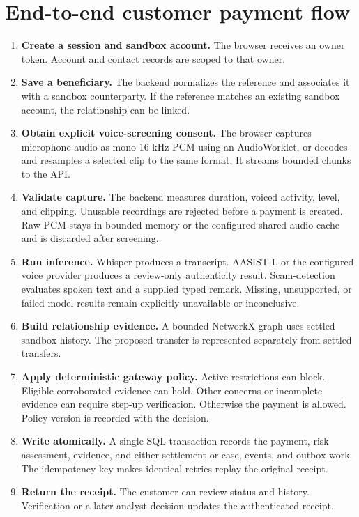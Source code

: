 \documentclass[11pt,a4paper]{article}
\begin{document}
\section{End-to-end customer payment flow}
\begin{enumerate}
\item \textbf{Create a session and sandbox account.} The browser receives an owner token. Account and contact records are scoped to that owner.
\item \textbf{Save a beneficiary.} The backend normalizes the reference and associates it with a sandbox counterparty. If the reference matches an existing sandbox account, the relationship can be linked.
\item \textbf{Obtain explicit voice-screening consent.} The browser captures microphone audio as mono 16 kHz PCM using an AudioWorklet, or decodes and resamples a selected clip to the same format. It streams bounded chunks to the API.
\item \textbf{Validate capture.} The backend measures duration, voiced activity, level, and clipping. Unusable recordings are rejected before a payment is created. Raw PCM stays in bounded memory or the configured shared audio cache and is discarded after screening.
\item \textbf{Run inference.} Whisper produces a transcript. AASIST-L or the configured voice provider produces a review-only authenticity result. Scam-detection evaluates spoken text and a supplied typed remark. Missing, unsupported, or failed model results remain explicitly unavailable or inconclusive.
\item \textbf{Build relationship evidence.} A bounded NetworkX graph uses settled sandbox history. The proposed transfer is represented separately from settled transfers.
\item \textbf{Apply deterministic gateway policy.} Active restrictions can block. Eligible corroborated evidence can hold. Other concerns or incomplete evidence can require step-up verification. Otherwise the payment is allowed. Policy version is recorded with the decision.
\item \textbf{Write atomically.} A single SQL transaction records the payment, risk assessment, evidence, and either settlement or case, events, and outbox work. The idempotency key makes identical retries replay the original receipt.
\item \textbf{Return the receipt.} The customer can review status and history. Verification or a later analyst decision updates the authenticated receipt.
\end{enumerate}
\end{document}

